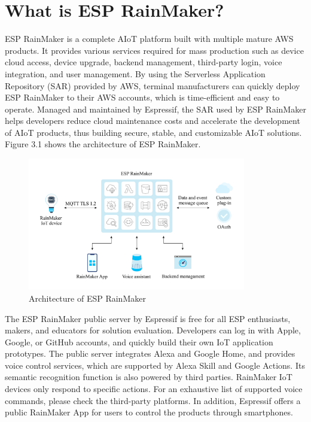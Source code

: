 \documentclass[a4paper,12pt,openany]{book}
\begin{document}
\section{What is ESP RainMaker?}
ESP RainMaker is a complete AIoT platform built with multiple mature AWS products. It provides various services required for mass production such as device cloud access, device upgrade, backend management, third-party login, voice integration, and user management. By using the Serverless Application Repository (SAR) provided by AWS, terminal manufacturers can quickly deploy ESP RainMaker to their AWS accounts, which is time-efficient and easy to operate. Managed and maintained by Espressif, the SAR used by ESP RainMaker helps developers reduce cloud maintenance costs and accelerate the development of AIoT products, thus building secure, stable, and customizable AIoT solutions. Figure 3.1 shows the architecture of ESP RainMaker.
\begin{figure}[!ht]
    \centering
    \includegraphics[width=0.85\textwidth]{D3Z/3-1}
    \caption{Architecture of ESP RainMaker}
\end{figure}

The ESP RainMaker public server by Espressif is free for all ESP enthusiasts, makers, and educators for solution evaluation. Developers can log in with Apple, Google, or GitHub accounts, and quickly build their own IoT application prototypes. The public server integrates Alexa and Google Home, and provides voice control services, which are supported by Alexa Skill and Google Actions. Its semantic recognition function is also powered by third parties. RainMaker IoT devices only respond to specific actions. For an exhaustive list of supported voice commands, please check the third-party platforms. In addition, Espressif offers a public RainMaker App for users to control the products through smartphones.
\end{document}
